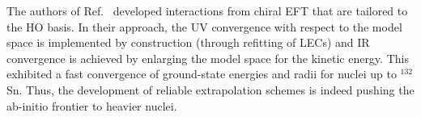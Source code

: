 	The authors of Ref.~\cite{Binder:2015trg} developed interactions from chiral
	EFT that are tailored to the HO basis.  In their approach, the UV convergence
	with respect to the model space is implemented by construction (through
	refitting of LECs) and IR convergence is achieved by enlarging the model
	space for the kinetic energy.  This exhibited a fast convergence of
	ground-state energies and radii for nuclei up to $^{132}$Sn.  Thus,
	the development of reliable extrapolation schemes is indeed pushing the
	ab-initio frontier to heavier nuclei.
